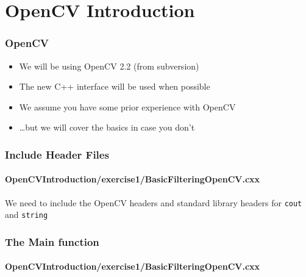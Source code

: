 \section{OpenCV Introduction}




\begin{frame}
\frametitle{OpenCV}
\begin{center}
\begin{itemize}
\item We will be using OpenCV 2.2 (from subversion)
\item The new C++ interface will be used when possible
\item We assume you have some prior experience with OpenCV
\item \ldots but we will cover the basics in case you don't
\end{itemize}
\end{center}
\end{frame}


\begin{frame}
\frametitle{Include Header Files}
\framesubtitle{OpenCVIntroduction/exercise1/BasicFilteringOpenCV.cxx}
\begin{center}
We need to include the OpenCV headers
\pause
\vspace{1 em}
and standard library headers for {\tt cout} and {\tt string}
\end{center}
\end{frame}


\begin{frame}
\frametitle{The Main function}
\framesubtitle{OpenCVIntroduction/exercise1/BasicFilteringOpenCV.cxx}
\begin{center}
\begin{itemize}
\end{itemize}
\end{center}
\end{frame}


